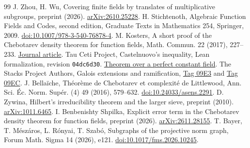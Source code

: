 \documentclass[preprint,12pt,numbers]{elsarticle}
\begin{document}
\begin{thebibliography}{99}
 J. Zhou, H. Wu, Covering finite fields by translates of
multiplicative subgroups, preprint (2026).
\href{https://arxiv.org/abs/2610.25228}{arXiv:2610.25228}.
 H. Stichtenoth, Algebraic Function Fields and Codes,
second edition, Graduate Texts in Mathematics 254, Springer, 2009.
\href{https://doi.org/10.1007/978-3-540-76878-4}{doi:10.1007/978-3-540-76878-4}.
 M. Kosters, A short proof of the Chebotarev density
theorem for function fields, Math. Commun. 22 (2017), 227--233.
\href{https://hrcak.srce.hr/file/274189}{Journal article}.
 Tau Ceti Project, Castelnuovo's inequality,
Lean formalization, revision \texttt{04dc6d30}.
\href{https://github.com/TauCetiProject/TauCeti/blob/04dc6d30e3935b9ea621d4ebb74d8ff2b0017a9b/TauCeti/FieldTheory/FunctionField/Consequences/Castelnuovo.lean}{Theorem over a perfect constant field}.
 The Stacks Project Authors, Galois extensions and
ramification, \href{https://stacks.math.columbia.edu/tag/09E3}{Tag 09E3}
and \href{https://stacks.math.columbia.edu/tag/09EC}{Tag 09EC}.
 J. Bella\"iche, Th\'eor\`eme de Chebotarev et
complexit\'e de Littlewood, Ann. Sci. \'Ec. Norm. Sup\'er. (4) 49
(2016), 579--632.
\href{https://doi.org/10.24033/asens.2291}{doi:10.24033/asens.2291}.
 D. Zywina, Hilbert's irreducibility theorem and the
larger sieve, preprint (2010).
\href{https://arxiv.org/abs/1011.6465}{arXiv:1011.6465}.
 I. Benbenishty Shpilka, Explicit error term in the
Chebotarev density theorem for function fields, preprint (2026).
\href{https://arxiv.org/abs/2611.28155}{arXiv:2611.28155}.
 T. Bayer, T. M\'esz\'aros, L. R\'onyai, T. Szab\'o,
Subgraphs of the projective norm graph, Forum Math. Sigma 14 (2026), e121.
\href{https://doi.org/10.1017/fms.2026.10245}{doi:10.1017/fms.2026.10245}.
\end{thebibliography}
\end{document}
